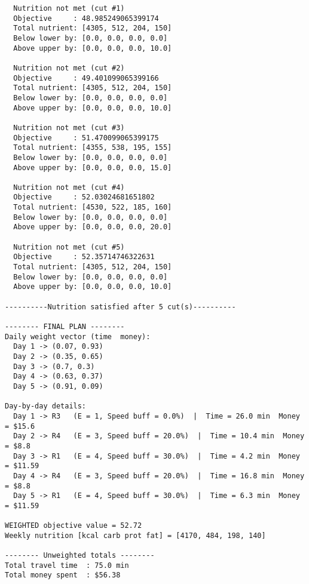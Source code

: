 \fontsize{10}{10}\selectfont

\begin{verbatim}
  Nutrition not met (cut #1)
  Objective     : 48.985249065399174
  Total nutrient: [4305, 512, 204, 150]
  Below lower by: [0.0, 0.0, 0.0, 0.0]
  Above upper by: [0.0, 0.0, 0.0, 10.0]

  Nutrition not met (cut #2)
  Objective     : 49.401099065399166
  Total nutrient: [4305, 512, 204, 150]
  Below lower by: [0.0, 0.0, 0.0, 0.0]
  Above upper by: [0.0, 0.0, 0.0, 10.0]

  Nutrition not met (cut #3)
  Objective     : 51.470099065399175
  Total nutrient: [4355, 538, 195, 155]
  Below lower by: [0.0, 0.0, 0.0, 0.0]
  Above upper by: [0.0, 0.0, 0.0, 15.0]

  Nutrition not met (cut #4)
  Objective     : 52.03024681651802
  Total nutrient: [4530, 522, 185, 160]
  Below lower by: [0.0, 0.0, 0.0, 0.0]
  Above upper by: [0.0, 0.0, 0.0, 20.0]

  Nutrition not met (cut #5)
  Objective     : 52.35714746322631
  Total nutrient: [4305, 512, 204, 150]
  Below lower by: [0.0, 0.0, 0.0, 0.0]
  Above upper by: [0.0, 0.0, 0.0, 10.0]

----------Nutrition satisfied after 5 cut(s)----------

-------- FINAL PLAN --------
Daily weight vector (time  money):
  Day 1 -> (0.07, 0.93)
  Day 2 -> (0.35, 0.65)
  Day 3 -> (0.7, 0.3)
  Day 4 -> (0.63, 0.37)
  Day 5 -> (0.91, 0.09)

Day‑by‑day details:
  Day 1 -> R3   (E = 1, Speed buff = 0.0%)  |  Time = 26.0 min  Money = $15.6
  Day 2 -> R4   (E = 3, Speed buff = 20.0%)  |  Time = 10.4 min  Money = $8.8
  Day 3 -> R1   (E = 4, Speed buff = 30.0%)  |  Time = 4.2 min  Money = $11.59
  Day 4 -> R4   (E = 3, Speed buff = 20.0%)  |  Time = 16.8 min  Money = $8.8
  Day 5 -> R1   (E = 4, Speed buff = 30.0%)  |  Time = 6.3 min  Money = $11.59

WEIGHTED objective value = 52.72
Weekly nutrition [kcal carb prot fat] = [4170, 484, 198, 140]

-------- Unweighted totals --------
Total travel time  : 75.0 min
Total money spent  : $56.38
\end{verbatim}